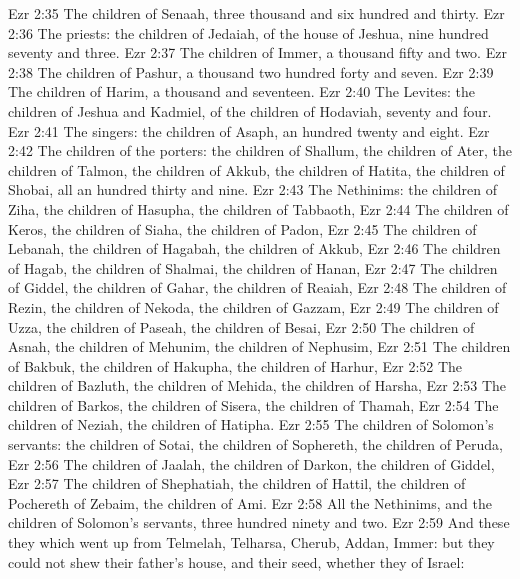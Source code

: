 \vs Ezr 2:35 The children of Senaah, three thousand and six hundred and thirty.
\vs Ezr 2:36 The priests: the children of Jedaiah, of the house of Jeshua, nine hundred seventy and three.
\vs Ezr 2:37 The children of Immer, a thousand fifty and two.
\vs Ezr 2:38 The children of Pashur, a thousand two hundred forty and seven.
\vs Ezr 2:39 The children of Harim, a thousand and seventeen.
\vs Ezr 2:40 The Levites: the children of Jeshua and Kadmiel, of the children of Hodaviah, seventy and four.
\vs Ezr 2:41 The singers: the children of Asaph, an hundred twenty and eight.
\vs Ezr 2:42 The children of the porters: the children of Shallum, the children of Ater, the children of Talmon, the children of Akkub, the children of Hatita, the children of Shobai,  all an hundred thirty and nine.
\vs Ezr 2:43 The Nethinims: the children of Ziha, the children of Hasupha, the children of Tabbaoth,
\vs Ezr 2:44 The children of Keros, the children of Siaha, the children of Padon,
\vs Ezr 2:45 The children of Lebanah, the children of Hagabah, the children of Akkub,
\vs Ezr 2:46 The children of Hagab, the children of Shalmai, the children of Hanan,
\vs Ezr 2:47 The children of Giddel, the children of Gahar, the children of Reaiah,
\vs Ezr 2:48 The children of Rezin, the children of Nekoda, the children of Gazzam,
\vs Ezr 2:49 The children of Uzza, the children of Paseah, the children of Besai,
\vs Ezr 2:50 The children of Asnah, the children of Mehunim, the children of Nephusim,
\vs Ezr 2:51 The children of Bakbuk, the children of Hakupha, the children of Harhur,
\vs Ezr 2:52 The children of Bazluth, the children of Mehida, the children of Harsha,
\vs Ezr 2:53 The children of Barkos, the children of Sisera, the children of Thamah,
\vs Ezr 2:54 The children of Neziah, the children of Hatipha.
\vs Ezr 2:55 The children of Solomon's servants: the children of Sotai, the children of Sophereth, the children of Peruda,
\vs Ezr 2:56 The children of Jaalah, the children of Darkon, the children of Giddel,
\vs Ezr 2:57 The children of Shephatiah, the children of Hattil, the children of Pochereth of Zebaim, the children of Ami.
\vs Ezr 2:58 All the Nethinims, and the children of Solomon's servants,  three hundred ninety and two.
\vs Ezr 2:59 And these  they which went up from Telmelah, Telharsa, Cherub, Addan,  Immer: but they could not shew their father's house, and their seed, whether they  of Israel:
